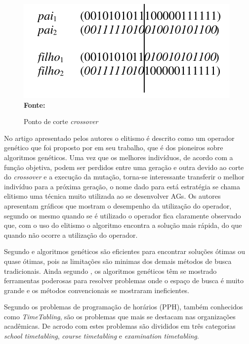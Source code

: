\begin{figure}[!htb]
\caption[Ponto de corte \textit{crossover}]{Ponto de corte \textit{crossover}}
\label{fig:pontoCorteAG}
\centering
\includegraphics[scale=0.7]{imagens/crossoverAG.png}
\\ \textbf{\footnotesize Fonte: \cite{de1999introduccao}}
\end{figure}

No artigo apresentado pelos autores \cite{de1999introduccao} o elitismo é descrito como um operador genético que foi proposto por \cite{DeJong} em seu trabalho, que é dos pioneiros sobre algoritmos genéticos. Uma vez que os melhores indivíduos, de acordo com a função objetiva, podem ser perdidos entre uma geração e outra devido ao corte do \textit{crossover} e a execução da mutação, torna-se interessante transferir o melhor indivíduo para a próxima geração, o nome dado para está estratégia se chama elitismo uma técnica muito utilizada ao se desenvolver AGs. Os autores apresentam gráficos que mostram o desempenho da utilização do operador, segundo os mesmo quando se é utilizado o operador fica claramente observado que, com o uso do elitismo o algoritmo encontra a solução mais rápida, do que quando não ocorre a utilização do operador.

Segundo \cite{hamawaki2011geraccao} e \cite{oliveira2005algoritmo} algoritmos genéticos são eficientes para encontrar soluções ótimas ou quase ótimas, pois as limitações são minimas dos demais métodos de busca tradicionais. Ainda segundo \cite{oliveira2005algoritmo}, os algoritmos genéticos têm se mostrado ferramentas poderosas para resolver problemas onde o espaço de busca é muito grande e os métodos convencionais se mostraram ineficientes.\par



Segundo \cite{kripkasimulated} os problemas de programação de horários (PPH), também conhecidos como \textit{TimeTabling}, são os problemas que mais se destacam nas organizações acadêmicas. De acrodo com \cite{schaerf1999survey} estes problemas são divididos em três categorias \textit{school timetabling}, \textit{course timetabling} e \textit{examination timetabling}.\par


